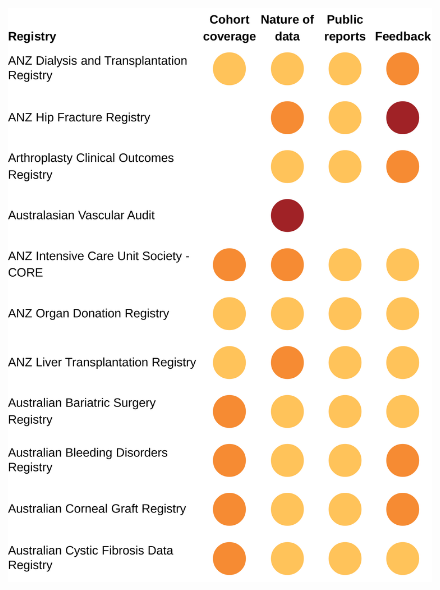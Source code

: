 \documentclass[FrontPage]{grattan}
\begin{document}
\begin{figure}
\includegraphics[page=1]{atlas/Registry_graphs.pdf}
\end{figure}
\end{document}
